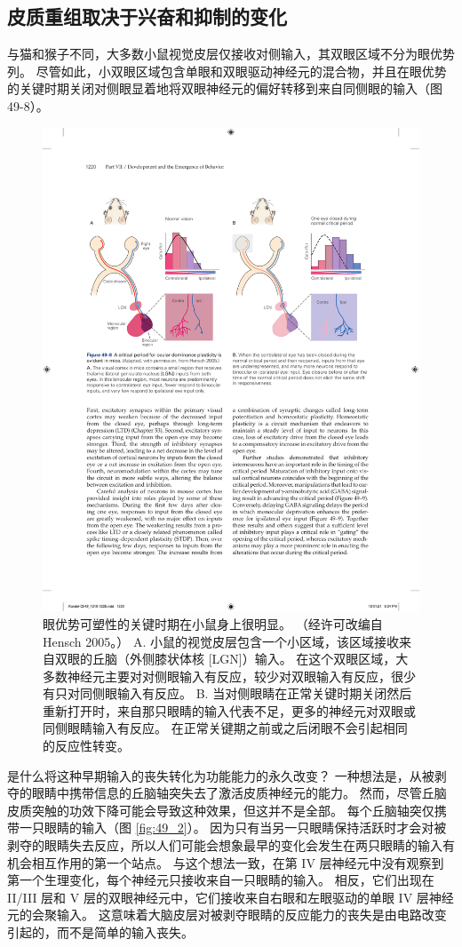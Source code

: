 \subsection{皮质重组取决于兴奋和抑制的变化}
与猫和猴子不同，大多数小鼠视觉皮层仅接收对侧输入，其双眼区域不分为眼优势列。 
尽管如此，小双眼区域包含单眼和双眼驱动神经元的混合物，并且在眼优势的关键时期关闭对侧眼显着地将双眼神经元的偏好转移到来自同侧眼的输入（图 49-8）。

\begin{figure}[htbp]
	\centering
	\includegraphics[width=0.9\linewidth]{chap49/fig_49_8}
	\caption{眼优势可塑性的关键时期在小鼠身上很明显。 （经许可改编自 Hensch 2005。） A. 小鼠的视觉皮层包含一个小区域，该区域接收来自双眼的丘脑（外侧膝状体核 [LGN]）输入。 在这个双眼区域，大多数神经元主要对对侧眼输入有反应，较少对双眼输入有反应，很少有只对同侧眼输入有反应。 B. 当对侧眼睛在正常关键时期关闭然后重新打开时，来自那只眼睛的输入代表不足，更多的神经元对双眼或同侧眼睛输入有反应。 在正常关键期之前或之后闭眼不会引起相同的反应性转变。}
	\label{fig:49_8}
\end{figure}

是什么将这种早期输入的丧失转化为功能能力的永久改变？ 一种想法是，从被剥夺的眼睛中携带信息的丘脑轴突失去了激活皮质神经元的能力。 然而，尽管丘脑皮质突触的功效下降可能会导致这种效果，但这并不是全部。 每个丘脑轴突仅携带一只眼睛的输入（图 \ref{fig:49_2}）。 因为只有当另一只眼睛保持活跃时才会对被剥夺的眼睛失去反应，所以人们可能会想象最早的变化会发生在两只眼睛的输入有机会相互作用的第一个站点。 与这个想法一致，在第 IV 层神经元中没有观察到第一个生理变化，每个神经元只接收来自一只眼睛的输入。 相反，它们出现在 II/III 层和 V 层的双眼神经元中，它们接收来自右眼和左眼驱动的单眼 IV 层神经元的会聚输入。 这意味着大脑皮层对被剥夺眼睛的反应能力的丧失是由电路改变引起的，而不是简单的输入丧失。

